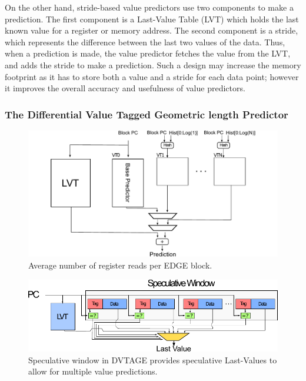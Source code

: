 On the other hand, stride-based value predictors use two components to make a prediction.
The first component is a Last-Value Table (LVT) which holds the last known value for a register or memory address.
The second component is a stride, which represents the difference between the last two values of the data.
Thus, when a prediction is made, the value predictor fetches the value from the LVT, and adds the stride to make a prediction.
Such a design may increase the memory footprint as it has to store both a value and a stride for each data point; however it improves the overall accuracy and usefulness of value predictors.

\subsubsection{The Differential Value Tagged Geometric length Predictor}
\begin{figure}[t]
    \centering
    \includegraphics[width=1\textwidth]{chapter3/graphics/basic_valpred.pdf}

    \caption{Average number of register reads per EDGE block.}
    \label{fig:edge_reg_read}
	\vspace{-1em}
\end{figure}

\begin{figure}[t]
    \centering
    \includegraphics[width=1\textwidth]{chapter3/graphics/specwindow.pdf}
    \caption{Speculative window in DVTAGE provides speculative Last-Values to allow for multiple value predictions.}
    \label{fig:edge_reg_read}
	\vspace{1em}
\end{figure}

